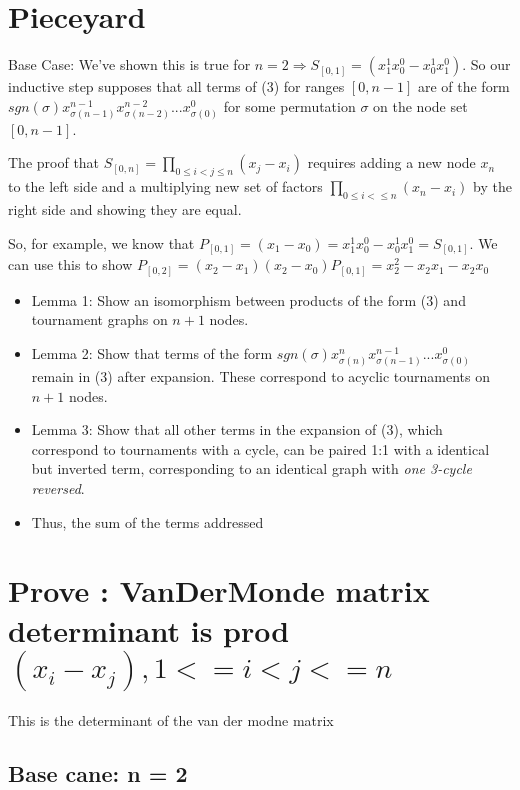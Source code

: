 \documentclass[11pt, oneside]{article} 	%
\begin{document}
\section{Pieceyard}


 
Base Case: We've shown this is true for  $n=2 \Rightarrow S_{[0,1]} = (x_1^1x_0^0 - x_0^1x_1^0)$.  
So our inductive step supposes that all terms of (3) for ranges $[0, n-1]$ are of the form  $sgn(\sigma) x_{\sigma(n-1)}^{n-1} x_{\sigma(n-2)}^{n-2} ... x_{\sigma(0)}^{0} $ for some permutation $\sigma$ on the node set $[0, n-1]$.  

The proof that  $S_[0,n] = \prod_{0 \leq i < j \leq n} (x_j - x_i)$ requires adding a new node $x_n$ to the left side and a multiplying new set of factors $\prod_{0 \leq i < \leq n} (x_n - x_i)$ by the right side and showing they are equal.

So, for example, we know that $P_{[0,1]} = (x_1 - x_0) = x_1^1x_0^0 - x_0^1x_1^0 = S_{[0,1]}$.
We can use this to show $P_{[0,2]} = (x_2 - x_1)(x_2-x_0)P_{[0,1]} = x_2^2-x_2x_1-x_2x_0$

\begin{itemize}
\item Lemma 1: Show an isomorphism between products of the form (3) and tournament graphs on $n+1$ nodes.
\item Lemma 2: Show that terms of the form $sgn(\sigma) x_{\sigma(n)}^n x_{\sigma(n-1)}^{n-1} ... x_{\sigma(0)}^{0} $ remain in (3) after expansion.  These correspond to acyclic tournaments on $n+1$ nodes.
\item Lemma 3: Show that all other terms in the expansion of (3), which correspond to tournaments with a cycle, can be paired 1:1 with a identical but inverted term, corresponding to an identical graph with \emph{one 3-cycle reversed}.
\item Thus, the sum of the terms addressed 
\end{itemize}

\section{Prove : VanDerMonde matrix determinant is prod $(x_i - x_j), 1 <= i < j <= n$}
 This is the determinant of the van der modne matrix
\subsection{Base cane: n = 2}
\end{document}
